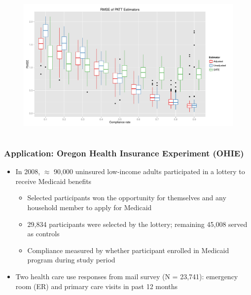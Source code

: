 \documentclass{beamer}
\begin{document}
\begin{frame}
\begin{figure}[htbp]
\centering
   \includegraphics[width=\linewidth]{../paper/mse_boxplots_B5.pdf} 
\label{simulation-plot}
\end{figure}
\end{frame}



\section[Application]{}

\begin{frame}
\frametitle{Application: Oregon Health Insurance Experiment (OHIE)}
\begin{itemize}
\item In 2008, $\approx$ 90,000 uninsured low-income adults participated in a lottery to receive Medicaid benefits \citep{finkelstein2012}
\begin{itemize}
\item Selected participants won the opportunity for themselves and any household member to apply for Medicaid
\item 29,834 participants were selected by the lottery; remaining 45,008 served as controls 
\item Compliance measured by whether participant enrolled in Medicaid program during study period
\end{itemize}
\item Two health care use responses from mail survey (N = 23,741): emergency room (ER) and primary care visits in past 12 months
\end{itemize}
\end{frame}
\end{document}
